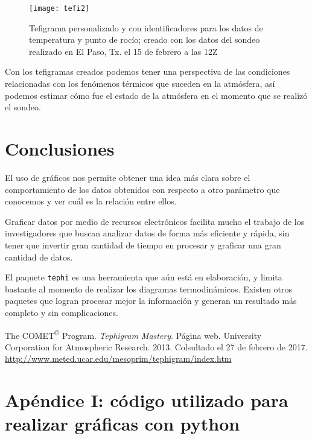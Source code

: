 \pagebreak
\begin{figure}[p ht!]
\texttt{[image: tefi2]}
\caption{Tefigrama personalizado y con identificadores para los datos de temperatura y punto de rocío; creado con los datos del sondeo realizado en El Paso, Tx. el 15 de febrero a las 12Z}
\label{teph2}
\end{figure}

Con los tefigramas creados podemos tener una perspectiva de las condiciones relacionadas con los fenómenos térmicos que suceden en la atmósfera, así podemos estimar cómo fue el estado de la atmósfera en el momento que se realizó el sondeo.
\pagebreak

\section{Conclusiones}
El uso de gráficos nos permite obtener una idea más clara sobre el comportamiento de los datos obtenidos con respecto a otro parámetro que conocemos y ver cuál es la relación entre ellos.

Graficar datos por medio de recursos electrónicos facilita mucho el trabajo de los investigadores que buscan analizar datos de forma más eficiente y rápida, sin tener que invertir gran cantidad de tiempo en procesar y graficar una gran cantidad de datos.

El paquete \texttt{tephi} es una herramienta que aún está en elaboración, y limita bastante al momento de realizar los diagramas termodinámicos. Existen otros paquetes que logran procesar mejor la información y generan un resultado más completo y sin complicaciones.

\newpage
\begin{thebibliography}{9}

The COMET\textsuperscript{\copyright} Program. 
\textit{Tephigram Mastery}. Página web. University Corporation for Atmospheric Research. 2013.
Colsultado el 27 de febrero de 2017. 
\url{http://www.meted.ucar.edu/mesoprim/tephigram/index.htm}
\end{thebibliography}

\newpage

\section*{Apéndice I: código utilizado para realizar gráficas con \textsf{python}}

